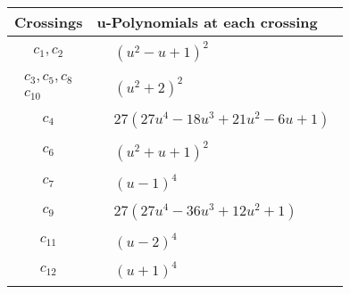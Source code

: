 \documentclass[1p]{elsarticle_modified}
\theoremstyle{definition}
\begin{document}
\begin{tabular}{m{50pt}|m{274pt}}
Crossings & \hspace{64pt}u-Polynomials at each crossing \\
\hline $$\begin{aligned}c_{1},c_{2}\end{aligned}$$&$\begin{aligned}
&(u^2- u+1)^2
\end{aligned}$\\
\hline $$\begin{aligned}c_{3},c_{5},c_{8}\\c_{10}\end{aligned}$$&$\begin{aligned}
&(u^2+2)^2
\end{aligned}$\\
\hline $$\begin{aligned}c_{4}\end{aligned}$$&$\begin{aligned}
&27(27 u^4-18 u^3+21 u^2-6 u+1)
\end{aligned}$\\
\hline $$\begin{aligned}c_{6}\end{aligned}$$&$\begin{aligned}
&(u^2+u+1)^2
\end{aligned}$\\
\hline $$\begin{aligned}c_{7}\end{aligned}$$&$\begin{aligned}
&(u-1)^4
\end{aligned}$\\
\hline $$\begin{aligned}c_{9}\end{aligned}$$&$\begin{aligned}
&27(27 u^4-36 u^3+12 u^2+1)
\end{aligned}$\\
\hline $$\begin{aligned}c_{11}\end{aligned}$$&$\begin{aligned}
&(u-2)^4
\end{aligned}$\\
\hline $$\begin{aligned}c_{12}\end{aligned}$$&$\begin{aligned}
&(u+1)^4
\end{aligned}$\\
\hline
\end{tabular}\\~\\
\end{document}

